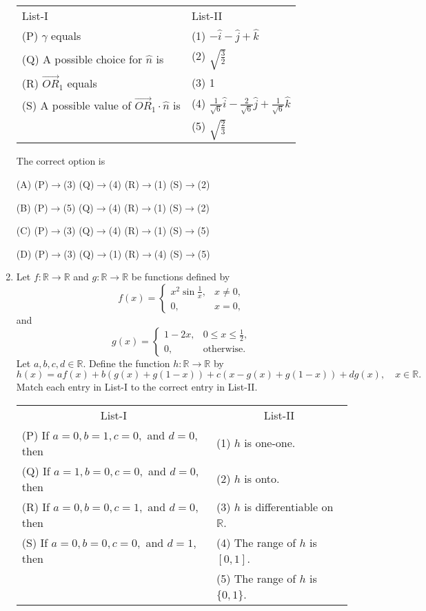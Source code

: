 \documentclass[12pt,a4paper]{article}
\begin{document}
\begin{enumerate}
\begin{tabular}{ll}
List-I & List-II \\
(P) $\gamma$ equals & (1) $-\hat{i}-\hat{j}+\hat{k}$ \\
(Q) A possible choice for $\hat{n}$ is & (2) $\sqrt{\frac{3}{2}}$ \\
(R) $\vec{OR}_{1}$ equals & (3) 1 \\
(S) A possible value of $\vec{OR}_{1}\cdot\hat{n}$ is & (4) $\frac{1}{\sqrt{6}}\hat{i}-\frac{2}{\sqrt{6}}\hat{j}+\frac{1}{\sqrt{6}}\hat{k}$ \\
& (5) $\sqrt{\frac{2}{3}}$
\end{tabular}

The correct option is

(A) (P)$\rightarrow$(3) \quad (Q)$\rightarrow$(4) \quad (R)$\rightarrow$(1) \quad (S)$\rightarrow$(2)

(B) (P)$\rightarrow$(5) \quad (Q)$\rightarrow$(4) \quad (R)$\rightarrow$(1) \quad (S)$\rightarrow$(2)

(C) (P)$\rightarrow$(3) \quad (Q)$\rightarrow$(4) \quad (R)$\rightarrow$(1) \quad (S)$\rightarrow$(5)

(D) (P)$\rightarrow$(3) \quad (Q)$\rightarrow$(1) \quad (R)$\rightarrow$(4) \quad (S)$\rightarrow$(5)

\item Let $f: \mathbb{R} \to \mathbb{R}$ and $g: \mathbb{R} \to \mathbb{R}$ be functions defined by
\[
f(x) =
\begin{cases} 
x^2 \sin \frac{1}{x}, & x \ne 0, \\
0, & x = 0,
\end{cases}
\]
and 
\[
g(x) = 
\begin{cases} 
1-2x, & 0 \le x \le \frac{1}{2}, \\
0, & \text{otherwise}.
\end{cases}
\]
Let $a, b, c, d \in \mathbb{R}$. Define the function $h: \mathbb{R} \to \mathbb{R}$ by
\[
h(x) = af(x) + b(g(x) + g(1-x)) + c(x - g(x) + g(1-x)) + d g(x), \quad x \in \mathbb{R}.
\]
Match each entry in List-I to the correct entry in List-II.

\begin{tabular}{ll}
\multicolumn{1}{c}{List-I} & \multicolumn{1}{c}{List-II} \\
(P) If $a=0, b=1, c=0,$ and $d=0$, then & (1) $h$ is one-one. \\
(Q) If $a=1, b=0, c=0,$ and $d=0$, then & (2) $h$ is onto. \\
(R) If $a=0, b=0, c=1,$ and $d=0$, then & (3) $h$ is differentiable on $\mathbb{R}$. \\
(S) If $a=0, b=0, c=0,$ and $d=1$, then & (4) The range of $h$ is $[0,1]$. \\
 & (5) The range of $h$ is $\{0,1\}$. 
\end{tabular}


\end{enumerate}
\end{document}
